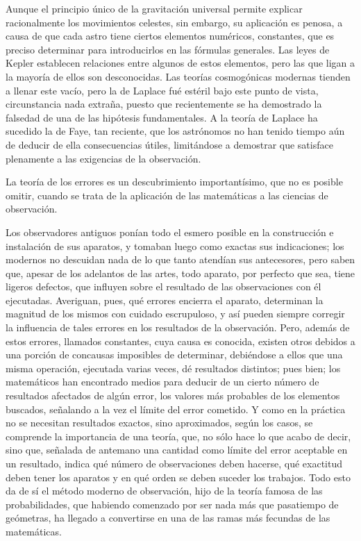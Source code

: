 \documentclass[a4paper, 12pt]{article}
\begin{document}
Aunque el principio único de la gravitación universal permite explicar racionalmente los movimientos celestes, sin embargo, su aplicación es penosa, a causa de que cada astro tiene ciertos elementos numéricos, constantes, que es preciso determinar para introducirlos en las fórmulas generales. Las leyes de Kepler establecen relaciones entre algunos de estos elementos, pero las que ligan a la mayoría de ellos son desconocidas. Las teorías cosmogónicas modernas tienden a llenar este vacío, pero la de Laplace fué estéril bajo este punto de vista, circunstancia nada extraña, puesto que recientemente se ha demostrado la falsedad de una de las hipótesis fundamentales. A la teoría de Laplace ha sucedido la de Faye, tan reciente, que los astrónomos no han tenido tiempo aún de deducir de ella consecuencias útiles, limitándose a demostrar que satisface plenamente a las exigencias de la observación.

La teoría de los errores es un descubrimiento importantísimo, que no es posible omitir, cuando se trata de la aplicación de las matemáticas a las ciencias de observación.

Los observadores antiguos ponían todo el esmero posible en la construcción e instalación de sus aparatos, y tomaban luego como exactas sus indicaciones; los modernos no descuidan nada de lo que tanto atendían sus antecesores, pero saben que, apesar de los adelantos de las artes, todo aparato, por perfecto que sea, tiene ligeros defectos, que influyen sobre el resultado de las observaciones con él ejecutadas. Averiguan, pues, qué errores encierra el aparato, determinan la magnitud de los mismos con cuidado escrupuloso, y así pueden siempre corregir la influencia de tales errores en los resultados de la observación. Pero, además de estos errores, llamados constantes, cuya causa es conocida, existen otros debidos a una porción de concausas imposibles de determinar, debiéndose a ellos que una misma operación, ejecutada varias veces, dé resultados distintos; pues bien; los matemáticos han encontrado medios para deducir de un cierto número de resultados afectados de algún error, los valores más probables de los elementos buscados, señalando a la vez el límite del error cometido. Y como en la práctica no se necesitan resultados exactos, sino aproximados, según los casos, se comprende la importancia de una teoría, que, no sólo hace lo que acabo de decir, sino que, señalada de antemano una cantidad como límite del error aceptable en un resultado, indica qué número de observaciones deben hacerse, qué exactitud deben tener los aparatos y en qué orden se deben suceder los trabajos. Todo esto da de sí el método moderno de observación, hijo de la teoría famosa de las probabilidades, que habiendo comenzado por ser nada más que pasatiempo de geómetras, ha llegado a convertirse en una de las ramas más fecundas de las matemáticas.
\end{document}
